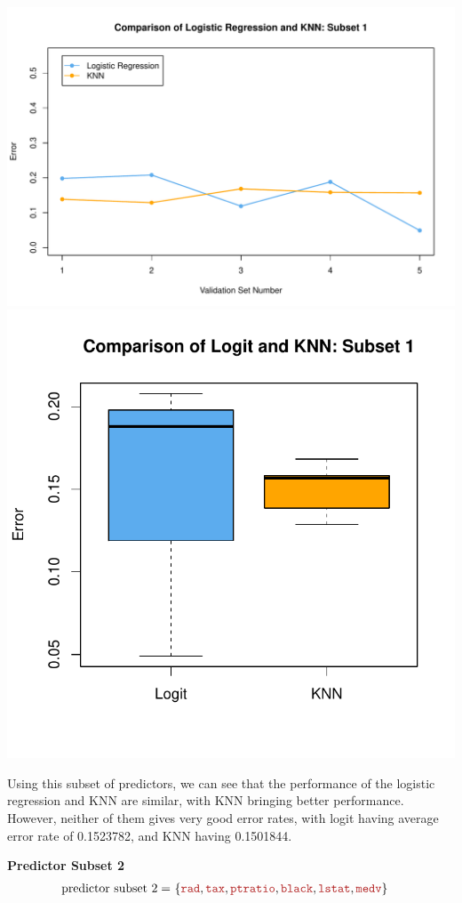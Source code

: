 \documentclass{article}
\begin{document}
\begin{center}
    \includegraphics[width=0.8\linewidth]{Images/Prob5/Prob5-13-Plot-Subset1.pdf}
    \includegraphics[width=0.45\linewidth]{Images/Prob5/Prob5-13-Boxplot-Subset1.pdf}
\end{center}

Using this subset of predictors, we can see that the performance of the logistic regression and KNN are similar, with KNN bringing better performance. 
However, neither of them gives very good error rates, with logit having average error rate of 0.1523782, and KNN having 0.1501844.
\bigskip




\noindent\textbf{Predictor Subset 2}
\[
    \begin{aligned}
    \text{predictor subset 2} =&\ 
    \{ 
        \feat{rad}, \feat{tax}, \feat{ptratio}, \feat{black}, \feat{lstat}, \feat{medv}
    \}
    \end{aligned}
\]
\end{document}
